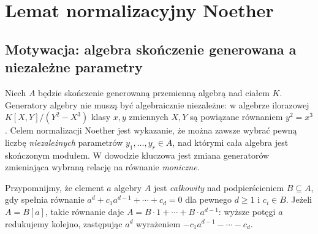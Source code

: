 \chapter{Lemat normalizacyjny Noether}\label{aa:ch:noether-normalization}

\providecommand{\atlasref}[2]{#2}
\section{Motywacja: algebra skończenie generowana a niezależne parametry}
Niech $A$ będzie skończenie generowaną przemienną algebrą nad ciałem
$K$. Generatory algebry nie muszą być algebraicznie niezależne:
w algebrze ilorazowej $K[X,Y]/(Y^2-X^3)$ klasy $x,y$
zmiennych $X,Y$ są powiązane równaniem $y^2=x^3$. Celem normalizacji Noether jest wykazanie,
że można zawsze wybrać pewną liczbę \emph{niezależnych} parametrów
$y_1,\ldots,y_r\in A$, nad którymi cała algebra jest skończonym
modułem. W dowodzie kluczowa jest zmiana generatorów zmieniająca
wybraną relację na równanie \emph{moniczne}.

Przypomnijmy, że element $a$ algebry $A$ jest \emph{całkowity}
nad podpierścieniem $B\subseteq A$, gdy spełnia równanie
$a^d+c_1a^{d-1}+\cdots+c_d=0$ dla pewnego $d\ge1$
i $c_i\in B$. Jeżeli $A=B[a]$, takie równanie daje
$A=B\cdot1+\cdots+B\cdot a^{d-1}$: wyższe potęgi $a$
redukujemy kolejno, zastępując $a^d$ wyrażeniem
$-c_1a^{d-1}-\cdots-c_d$.

